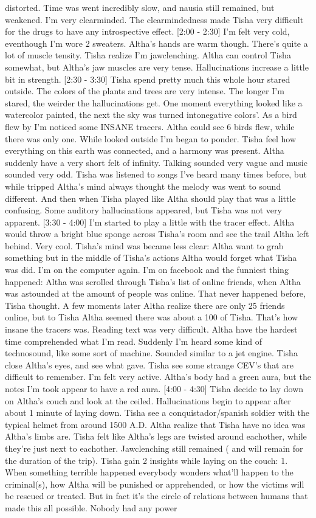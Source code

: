 \documentclass[12pt]{book}
\begin{document}
distorted. Time was went incredibly slow, and nausia still remained, but weakened. I'm very clearminded. The clearmindedness made Tisha very difficult for the drugs to have any introspective effect. [2:00 - 2:30] I'm felt very cold, eventhough I'm wore 2 sweaters. Altha's hands are warm though. There's quite a lot of muscle tensity. Tisha realize I'm jawclenching. Altha can control Tisha somewhat, but Altha's jaw muscles are very tense. Hallucinations increase a little bit in strength. [2:30 - 3:30] Tisha spend pretty much this whole hour stared outside. The colors of the plants and trees are very intense. The longer I'm stared, the weirder the hallucinations get. One moment everything looked like a watercolor painted, the next the sky was turned intonegative colors'. As a bird flew by I'm noticed some INSANE tracers. Altha could see 6 birds flew, while there was only one. While looked outside I'm began to ponder. Tisha feel how everything on this earth was connected, and a harmony was present. Altha suddenly have a very short felt of infinity. Talking sounded very vague and music sounded very odd. Tisha was listened to songs I've heard many times before, but while tripped Altha's mind always thought the melody was went to sound different. And then when Tisha played like Altha should play that was a little confusing. Some auditory hallucinations appeared, but Tisha was not very apparent. [3:30 - 4:00] I'm started to play a little with the tracer effect. Altha would throw a bright blue sponge across Tisha's room and see the trail Altha left behind. Very cool. Tisha's mind was became less clear: Altha want to grab something but in the middle of Tisha's actions Altha would forget what Tisha was did. I'm on the computer again. I'm on facebook and the funniest thing happened: Altha was scrolled through Tisha's list of online friends, when Altha was astounded at the amount of people was online. That never happened before, Tisha thought. A few moments later Altha realize there are only 25 friends online, but to Tisha Altha seemed there was about a 100 of Tisha. That's how insane the tracers was. Reading text was very difficult. Altha have the hardest time comprehended what I'm read. Suddenly I'm heard some kind of technosound, like some sort of machine. Sounded similar to a jet engine. Tisha close Altha's eyes, and see what gave. Tisha see some strange CEV's that are difficult to remember. I'm felt very active. Altha's body had a green aura, but the notes I'm took appear to have a red aura. [4:00 - 4:30] Tisha decide to lay down on Altha's couch and look at the ceiled. Hallucinations begin to appear after about 1 minute of laying down. Tisha see a conquistador/spanish soldier with the typical helmet from around 1500 A.D. Altha realize that Tisha have no idea was Altha's limbs are. Tisha felt like Altha's legs are twisted around eachother, while they're just next to eachother. Jawclenching still remained ( and will remain for the duration of the trip). Tisha gain 2 insights while laying on the couch: 1. When something terrible happened everybody wonders what'll happen to the criminal(s), how Altha will be punished or apprehended, or how the victims will be rescued or treated. But in fact it's the circle of relations between humans that made this all possible. Nobody had any power 
\end{document}

